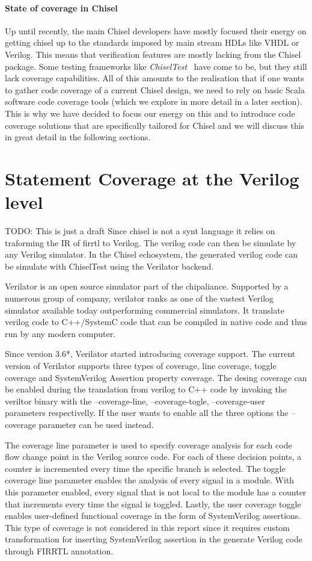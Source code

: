 \documentclass[conference]{IEEEtran}
\newcommand{\todo}[1]{{\color{olive} TODO: #1}}
\begin{document}
\paragraph{State of coverage in Chisel} Up until recently, the main Chisel developers have mostly focused their energy on getting chisel up to the standards imposed by main stream HDLs like VHDL or Verilog. This means that verification features are mostly lacking from the Chisel package. Some testing frameworks like \textit{ChiselTest}~\cite{chisel:tester2} have come to be, but they still lack coverage capabilities. All of this amounts to the realisation that if one wants to gather code coverage of a current Chisel design, we need to rely on basic Scala software code coverage tools (which we explore in more detail in a later section). This is why we have decided to focus our energy on this and to introduce code coverage solutions that are specifically tailored for Chisel and we will discuss this in great detail in the following sections.

\section{Statement Coverage at the Verilog level}
\todo{This is just a draft}
Since chisel is not a synt language it relies on traforming the IR of firrtl to Verilog.
The verilog code can then be simulate by any Verilog simulator. In the Chisel echosystem,
the generated verilog code can be simulate with ChiselTest using the Verilator backend.

Verilator is an open source simulator part of the chipaliance. Supported by a numerous group of company,
verilator ranks as one of the vastest Verilog simulator available today outperforming commercial simulators. It translate
verilog code to C++/SystemC code that can be compiled in native code and thus run by any modern computer.

Since version 3.6*, Verilator started introducing coverage support. The current version of Verilator supports three types
of coverage, line coverage, toggle coverage and SystemVerilog Assertion property coverage. The desing coverage can be enabled
during the translation from verilog to C++ code by invoking the veriltor binary with the --coverage-line, --coverage-togle, --coverage-user parameters respectivelly.
If the user wants to enable all the three options the --coverage parameter can be used instead.

The coverage line parameter is used to specify coverage analysis for each code flow change point in the Verilog source code. For each of these decision points, a counter is incremented every time the specific branch is selected. The toggle coverage line parameter enables the analysis of every signal in a module. With this parameter enabled, every signal that is not local to the module has a counter that increments every time the signal is toggled. Lastly, the user coverage toggle enables user-defined functional coverage in the form of SystemVerilog assertions. This type of coverage is not considered in this report since it requires custom transformation for inserting SystemVerilog assertion in the generate Verilog code through FIRRTL annotation. 
\end{document}
